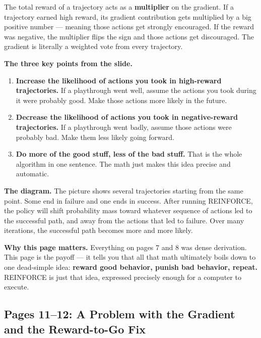 \medskip
The total reward of a trajectory acts as a \textbf{multiplier} on the gradient. If a trajectory
earned high reward, its gradient contribution gets multiplied by a big positive number ---
meaning those actions get strongly encouraged. If the reward was negative, the multiplier
flips the sign and those actions get discouraged. The gradient is literally a weighted vote
from every trajectory.

\medskip
\textbf{The three key points from the slide.}

\begin{enumerate}
  \item \textbf{Increase the likelihood of actions you took in high-reward trajectories.}
        If a playthrough went well, assume the actions you took during it were probably good.
        Make those actions more likely in the future.

  \item \textbf{Decrease the likelihood of actions you took in negative-reward trajectories.}
        If a playthrough went badly, assume those actions were probably bad. Make them less
        likely going forward.

  \item \textbf{Do more of the good stuff, less of the bad stuff.}
        That is the whole algorithm in one sentence. The math just makes this idea precise
        and automatic.
\end{enumerate}

\textbf{The diagram.} The picture shows several trajectories starting from the same point.
Some end in failure and one ends in success. After running REINFORCE, the policy will shift
probability mass toward whatever sequence of actions led to the successful path, and away
from the actions that led to failure. Over many iterations, the successful path becomes more
and more likely.

\textbf{Why this page matters.} Everything on pages 7 and 8 was dense derivation. This page
is the payoff --- it tells you that all that math ultimately boils down to one dead-simple
idea: \textbf{reward good behavior, punish bad behavior, repeat.} REINFORCE is just that idea,
expressed precisely enough for a computer to execute.


\subsection{Pages 11--12: A Problem with the Gradient and the Reward-to-Go Fix}

